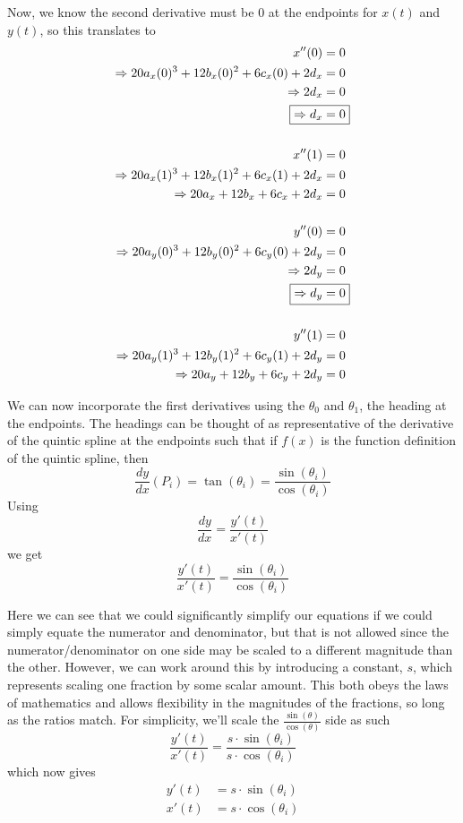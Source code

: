 \documentclass[12pt, letterpaper]{article}
\begin{document}
Now, we know the second derivative must be \(0\) at the endpoints for \(x(t)\) and \(y(t)\), so this translates to 
\begin{align}
x''(0) &= 0 \nonumber \\
\Rightarrow 20a_x(0)^3 + 12b_x(0)^2 + 6c_x(0) + 2d_x &= 0 \nonumber \\
\Rightarrow 2d_x &= 0 \nonumber \\
\Aboxed{\Rightarrow d_x &= 0} \\
\nonumber \\
x''(1) &= 0 \nonumber \\
\Rightarrow 20a_x(1)^3 + 12b_x(1)^2 + 6c_x(1) + 2d_x &= 0 \nonumber \\
\Rightarrow 20a_x + 12b_x + 6c_x + 2d_x &= 0 \\
\nonumber \\
y''(0) &= 0 \nonumber \\
\Rightarrow 20a_y(0)^3 + 12b_y(0)^2 + 6c_y(0) + 2d_y &= 0 \nonumber \\
\Rightarrow 2d_y &= 0 \nonumber \\
\Aboxed{\Rightarrow d_y &= 0} \\
\nonumber \\
y''(1) &= 0 \nonumber \\
\Rightarrow 20a_y(1)^3 + 12b_y(1)^2 + 6c_y(1) + 2d_y &= 0 \nonumber \\
\Rightarrow 20a_y + 12b_y + 6c_y + 2d_y &= 0 
\end{align}

We can now incorporate the first derivatives using the \(\theta_0\) and \(\theta_1\), the heading at the endpoints. The headings can be thought of as representative of the derivative of the quintic spline at the endpoints such that if \(f(x)\) is the function definition of the quintic spline, then \[\frac{dy}{dx}(P_i) = \tan(\theta_i) = \frac{\sin(\theta_i)}{\cos(\theta_i)}\] Using \[\frac{dy}{dx} = \frac{y'(t)}{x'(t)}\] we get \[\frac{y'(t)}{x'(t)} = \frac{\sin(\theta_i)}{\cos(\theta_i)}\]

Here we can see that we could significantly simplify our equations if we could simply equate the numerator and denominator, but that is not allowed since the numerator/denominator on one side may be scaled to a different magnitude than the other. However, we can work around this by introducing a constant, \(s\), which represents scaling one fraction by some scalar amount. This both obeys the laws of mathematics and allows flexibility in the magnitudes of the fractions, so long as the ratios match. For simplicity, we'll scale the \(\frac{\sin(\theta)}{\cos(\theta)}\) side as such
\[\frac{y'(t)}{x'(t)} = \frac{s \cdot \sin(\theta_i)}{s \cdot \cos(\theta_i)}\]
which now gives 
\begin{align*}
y'(t) &= s \cdot \sin(\theta_i) \\
x'(t) &= s \cdot \cos(\theta_i)
\end{align*}
\end{document}
